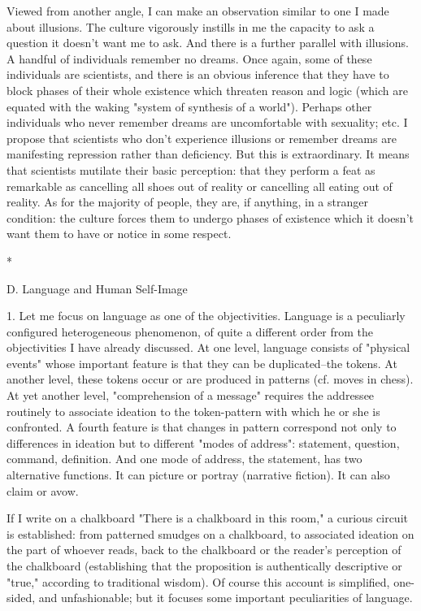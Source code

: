 Viewed from another angle, I can make an observation similar to one I made about illusions. The culture vigorously instills in me the capacity to ask a question it doesn't want me to ask. And there is a further parallel with illusions. A handful of individuals remember no dreams. Once again, some of these individuals are scientists, and there is an obvious inference that they have to block phases of their whole existence which threaten reason and logic (which are equated with the waking "system of synthesis of a world"). Perhaps other individuals who never remember dreams are uncomfortable with sexuality; etc. I propose that scientists who don't experience illusions or remember dreams are manifesting repression rather than deficiency. But this is extraordinary. It means that scientists mutilate their basic perception: that they perform a feat as remarkable as cancelling all shoes out of reality or cancelling all eating out of reality. As for the majority of people, they are, if anything, in a stranger condition: the culture forces them to undergo phases of existence which it doesn't want them to have or notice in some respect.

*

D. Language and Human Self-Image

1. Let me focus on language as one of the objectivities. Language is a peculiarly configured heterogeneous phenomenon, of quite a different order from the objectivities I have already discussed. At one level, language consists of "physical events" whose important feature is that they can be duplicated--the tokens. At another level, these tokens occur or are produced in patterns (cf. moves in chess). At yet another level, "comprehension of a message" requires the addressee routinely to associate ideation to the token-pattern with which he or she is confronted. A fourth feature is that changes in pattern correspond not only to differences in ideation but to different "modes of address": statement, question, command, definition. And one mode of address, the statement, has two alternative functions. It can picture or portray (narrative fiction). It can also claim or avow.

If I write on a chalkboard "There is a chalkboard in this room," a curious circuit is established: from patterned smudges on a chalkboard, to associated ideation on the part of whoever reads, back to the chalkboard or the reader's perception of the chalkboard (establishing that the proposition is authentically descriptive or "true," according to traditional wisdom). Of course this account is simplified, one-sided, and unfashionable; but it focuses some important peculiarities of language.

